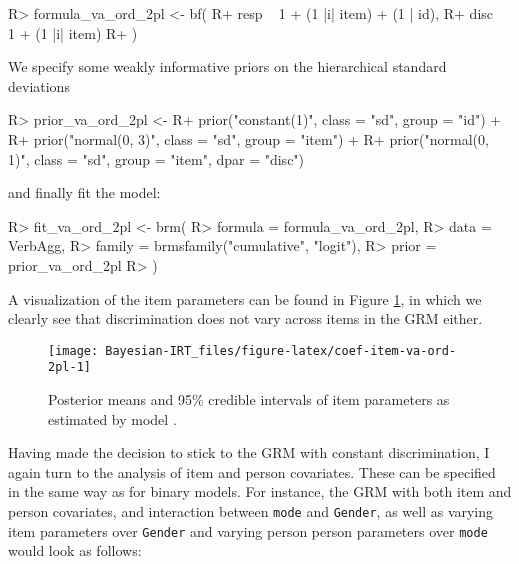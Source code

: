 \documentclass[
]{jss}
\begin{document}
\begin{CodeChunk}

\begin{CodeInput}
R> formula_va_ord_2pl <- bf(
R+   resp ~ 1 + (1 |i| item) + (1 | id),
R+   disc ~ 1 + (1 |i| item)    
R+ )
\end{CodeInput}
\end{CodeChunk}

We specify some weakly informative priors on the hierarchical standard
deviations

\begin{CodeChunk}

\begin{CodeInput}
R> prior_va_ord_2pl <- 
R+   prior("constant(1)", class = "sd", group = "id") + 
R+   prior("normal(0, 3)", class = "sd", group = "item") +
R+   prior("normal(0, 1)", class = "sd", group = "item", dpar = "disc") 
\end{CodeInput}
\end{CodeChunk}

and finally fit the model:

\begin{CodeChunk}

\begin{CodeInput}
R> fit_va_ord_2pl <- brm(
R>   formula = formula_va_ord_2pl,
R>   data = VerbAgg,
R>   family = brmsfamily("cumulative", "logit"),
R>   prior = prior_va_ord_2pl
R> )
\end{CodeInput}
\end{CodeChunk}

A visualization of the item parameters can be found in Figure
\ref{fig:coef-item-va-ord-2pl}, in which we clearly see that
discrimination does not vary across items in the GRM either.

\begin{CodeChunk}
\begin{figure}

{\centering \texttt{[image: Bayesian-IRT\_files/figure-latex/coef-item-va-ord-2pl-1]} 

}

\caption[Posterior means and 95\% credible intervals of item parameters as estimated by model ]{Posterior means and 95\% credible intervals of item parameters as estimated by model .}\label{fig:coef-item-va-ord-2pl}
\end{figure}
\end{CodeChunk}

Having made the decision to stick to the GRM with constant
discrimination, I again turn to the analysis of item and person
covariates. These can be specified in the same way as for binary models.
For instance, the GRM with both item and person covariates, and
interaction between \texttt{mode} and \texttt{Gender}, as well as
varying item parameters over \texttt{Gender} and varying person person
parameters over \texttt{mode} would look as follows:
\end{document}
